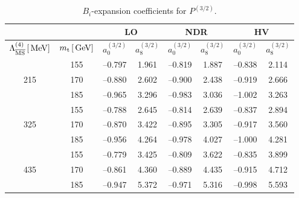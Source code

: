 \begin{table}[htb]
\caption[]{$B_i$-expansion coefficients for $P^{(3/2)}$.
\label{tab:bip32}}
\begin{center}
\begin{tabular}{|c|c||c|c||c|c||c|c|}
& & \multicolumn{2}{c||}{LO} &
  \multicolumn{2}{c||}{NDR} &
  \multicolumn{2}{c|}{HV} \\
\hline
$\Lambda_{\overline{\rm MS}}^{(4)}\,[\, {\rm MeV}]$ & $m_{\rm t}\,[\, {\rm GeV}]$ &
$a_0^{(3/2)}$ & $a_8^{(3/2)}$ & $a_0^{(3/2)}$ &
$a_8^{(3/2)}$ & $a_0^{(3/2)}$ & $a_8^{(3/2)}$ \\
\hline
    & 155  &  --0.797 & 1.961  &  --0.819 & 1.887  &  --0.838 & 2.114 \\
215 & 170  &  --0.880 & 2.602  &  --0.900 & 2.438  &  --0.919 & 2.666 \\
    & 185  &  --0.965 & 3.296  &  --0.983 & 3.036  &  --1.002 & 3.263 \\
\hline 
    & 155  &  --0.788 & 2.645  &  --0.814 & 2.639  &  --0.837 & 2.894 \\
325 & 170  &  --0.870 & 3.422  &  --0.895 & 3.305  &  --0.917 & 3.560 \\
    & 185  &  --0.956 & 4.264  &  --0.978 & 4.027  &  --1.000 & 4.281 \\
\hline 
    & 155  &  --0.779 & 3.425  &  --0.809 & 3.622  &  --0.835 & 3.899 \\
435 & 170  &  --0.861 & 4.360  &  --0.889 & 4.435  &  --0.915 & 4.712 \\
    & 185  &  --0.947 & 5.372  &  --0.971 & 5.316  &  --0.998 & 5.593
\end{tabular}
\end{center}
\end{table}

